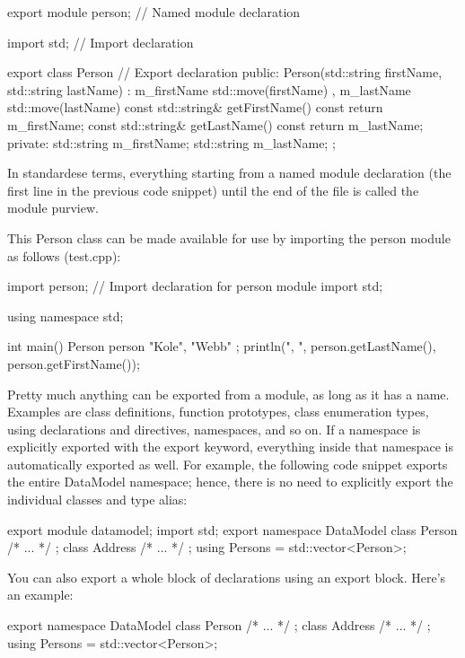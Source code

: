 \begin{cpp}
export module person; // Named module declaration

import std; // Import declaration

export class Person // Export declaration
{
    public:
        Person(std::string firstName, std::string lastName)
            : m_firstName { std::move(firstName) }
            , m_lastName { std::move(lastName) } { }
        const std::string& getFirstName() const { return m_firstName; }
        const std::string& getLastName() const { return m_lastName; }
    private:
        std::string m_firstName;
        std::string m_lastName;
};
\end{cpp}

In standardese terms, everything starting from a named module declaration (the first line in the previous code snippet) until the end of the file is called the module purview.

This Person class can be made available for use by importing the person module as follows (test.cpp):

\begin{cpp}
import person; // Import declaration for person module
import std;

using namespace std;

int main()
{
    Person person { "Kole", "Webb" };
    println("{}, {}", person.getLastName(), person.getFirstName());
}
\end{cpp}

Pretty much anything can be exported from a module, as long as it has a name. Examples are class definitions, function prototypes, class enumeration types, using declarations and directives, namespaces, and so on. If a namespace is explicitly exported with the export keyword, everything inside that namespace is automatically exported as well. For example, the following code snippet exports the entire DataModel namespace; hence, there is no need to explicitly export the individual classes and type alias:

\begin{cpp}
export module datamodel;
import std;
export namespace DataModel
{
    class Person { /* ... */ };
    class Address { /* ... */ };
    using Persons = std::vector<Person>;
}
\end{cpp}

You can also export a whole block of declarations using an export block. Here’s an example:

\begin{cpp}
export
{
    namespace DataModel
    {
        class Person { /* ... */ };
        class Address { /* ... */ };
        using Persons = std::vector<Person>;
    }
}
\end{cpp}


